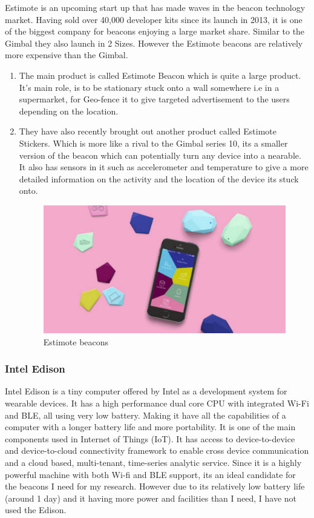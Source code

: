 Estimote\cite{estimote} is an upcoming start up that has made waves
in the beacon technology market. Having sold over 40,000 developer
kits since its launch in 2013, it is one of the biggest company for
beacons enjoying a large market share. Similar to the Gimbal they
also launch in 2 Sizes. However the Estimote beacons are relatively
more expensive than the Gimbal.
\begin{enumerate}
\item The main product is called Estimote Beacon which is quite a large
product. It's main role, is to be stationary stuck onto a wall somewhere
i.e in a supermarket, for Geo-fence it to give targeted advertisement
to the users depending on the location.  
\item They have also recently brought out another product called Estimote
Stickers. Which is more like a rival to the Gimbal series 10, its
a smaller version of the beacon which can potentially turn any device
into a nearable. It also has sensors in it such as accelerometer and
temperature to give a more detailed information on the activity and
the location of the device its stuck onto.
\begin{figure}[H]
\includegraphics[scale=0.3]{images/estimote}

\protect\caption{Estimote beacons}


\end{figure}

\end{enumerate}

\subsubsection{Intel Edison}

Intel Edison\cite{intel-edision} is a tiny computer offered by Intel
as a development system for wearable devices. It has a high performance
dual core CPU with integrated Wi-Fi and BLE, all using very low battery.
Making it have all the capabilities of a computer with a longer battery
life and more portability. It is one of the main components used in
Internet of Things (IoT). It has access to device-to-device and device-to-cloud
connectivity framework to enable cross device communication and a
cloud based, multi-tenant, time-series analytic service. Since it
is a highly powerful machine with both Wi-fi and BLE support, its
an ideal candidate for the beacons I need for my research. However
due to its relatively low battery life (around 1 day) and it having
more power and facilities than I need, I have not used the Edison.

